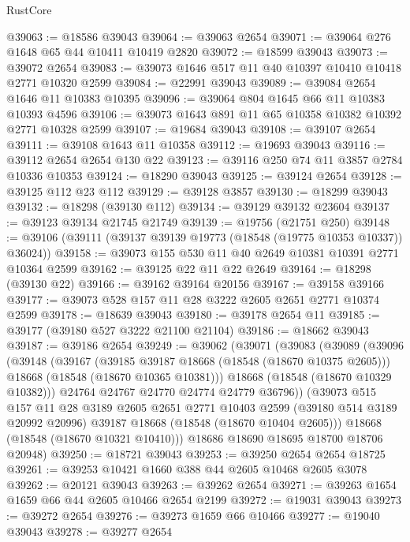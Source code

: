 \begin{lexlean}{RustCore}
\begin{coremodule}
@39063 := @18586 @39043
@39064 := @39063 @2654
@39071 := @39064 @276 @1648 @65 @44 @10411 @10419 @2820
@39072 := @18599 @39043
@39073 := @39072 @2654
@39083 := @39073 @1646 @517 @11 @40 @10397 @10410 @10418 @2771 @10320 @2599
@39084 := @22991 @39043
@39089 := @39084 @2654 @1646 @11 @10383 @10395
@39096 := @39064 @804 @1645 @66 @11 @10383 @10393 @4596
@39106 := @39073 @1643 @891 @11 @65 @10358 @10382 @10392 @2771 @10328 @2599
@39107 := @19684 @39043
@39108 := @39107 @2654
@39111 := @39108 @1643 @11 @10358
@39112 := @19693 @39043
@39116 := @39112 @2654 @2654 @130 @22
@39123 := @39116 @250 @74 @11 @3857 @2784 @10336 @10353
@39124 := @18290 @39043
@39125 := @39124 @2654
@39128 := @39125 @112 @23 @112
@39129 := @39128 @3857
@39130 := @18299 @39043
@39132 := @18298 (@39130 @112)
@39134 := @39129 @39132 @23604
@39137 := @39123 @39134 @21745 @21749
@39139 := @19756 (@21751 @250)
@39148 := @39106 (@39111 (@39137 @39139 @19773 (@18548 (@19775 @10353 @10337)) @36024))
@39158 := @39073 @155 @530 @11 @40 @2649 @10381 @10391 @2771 @10364 @2599
@39162 := @39125 @22 @11 @22 @2649
@39164 := @18298 (@39130 @22)
@39166 := @39162 @39164 @20156
@39167 := @39158 @39166
@39177 := @39073 @528 @157 @11 @28 @3222 @2605 @2651 @2771 @10374 @2599
@39178 := @18639 @39043
@39180 := @39178 @2654 @11
@39185 := @39177 (@39180 @527 @3222 @21100 @21104)
@39186 := @18662 @39043
@39187 := @39186 @2654
@39249 := @39062
    (@39071
      (@39083
        (@39089
          (@39096
            (@39148
              (@39167
                (@39185 @39187 @18668 (@18548 (@18670 @10375 @2605)))
                @18668
                (@18548 (@18670 @10365 @10381)))
              @18668
              (@18548 (@18670 @10329 @10382)))
            @24764
            @24767
            @24770
            @24774
            @24779
            @36796))
        (@39073
          @515
          @157
          @11
          @28
          @3189
          @2605
          @2651
          @2771
          @10403
          @2599
          (@39180 @514 @3189 @20992 @20996)
          @39187
          @18668
          (@18548 (@18670 @10404 @2605)))
        @18668
        (@18548 (@18670 @10321 @10410)))
      @18686
      @18690
      @18695
      @18700
      @18706
      @20948)
@39250 := @18721 @39043
@39253 := @39250 @2654 @2654 @18725
@39261 := @39253 @10421 @1660 @388 @44 @2605 @10468 @2605 @3078
@39262 := @20121 @39043
@39263 := @39262 @2654
@39271 := @39263 @1654 @1659 @66 @44 @2605 @10466 @2654 @2199
@39272 := @19031 @39043
@39273 := @39272 @2654
@39276 := @39273 @1659 @66 @10466
@39277 := @19040 @39043
@39278 := @39277 @2654

\end{coremodule}
\end{lexlean}
